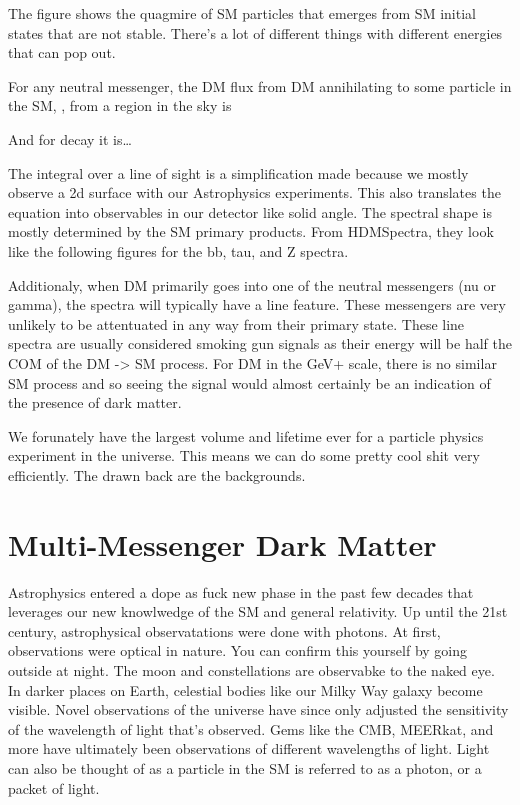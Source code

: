 
The figure shows the quagmire of SM particles that emerges from SM initial states that are not stable.
There's a lot of different things with different energies that can pop out.

For any neutral messenger, the DM flux from DM annihilating to some particle in the SM, \textphi, from a region in the sky is


And for decay it is\dots



The integral over a line of sight is a simplification made because we mostly observe a 2d surface with our Astrophysics experiments.
This also translates the equation into observables in our detector like solid angle.
The spectral shape is mostly determined by the SM primary products.
From HDMSpectra, they look like the following figures for the bb, tau, and Z spectra.


Additionaly, when DM primarily goes into one of the neutral messengers (nu or gamma), the spectra will typically have a line feature.
These messengers are very unlikely to be attentuated in any way from their primary state.
These line spectra are usually considered smoking gun signals as their energy will be half the COM of the DM -> SM process.
For DM in the GeV+ scale, there is no similar SM process and so seeing the signal would almost certainly be an indication of the presence of dark matter.


We forunately have the largest volume and lifetime ever for a particle physics experiment in the universe.
This means we can do some pretty cool shit very efficiently.
The drawn back are the backgrounds.
\section{Multi-Messenger Dark Matter \label{sec:mult-messengerDM}}

Astrophysics entered a dope as fuck new phase in the past few decades that leverages our new knowlwedge of the SM and general relativity.
Up until the 21st century, astrophysical observatations were done with photons.
At first, observations were optical in nature.
You can confirm this yourself by going outside at night.
The moon and constellations are observabke to the naked eye.
In darker places on Earth, celestial bodies like our Milky Way galaxy become visible.
Novel observations of the universe have since only adjusted the sensitivity of the wavelength of light that's observed.
Gems like the CMB, MEERkat, \ns and more have ultimately been observations of different wavelengths of light.
Light can also be thought of as a particle in the SM is referred to as a photon, or a packet of light.

